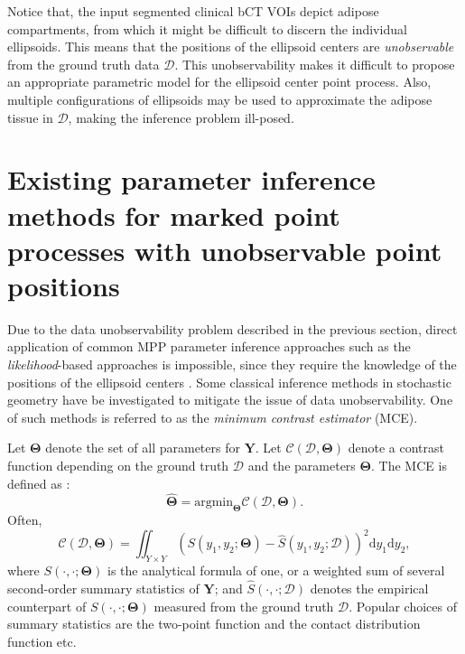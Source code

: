 \documentclass[journal]{IEEEtran}
\newcommand{\dd}[1]{\mathrm{d}#1}%
\begin{document}
Notice that, the input segmented clinical bCT VOIs depict adipose
compartments, from which it might be difficult to discern the
individual ellipsoids. This means that the positions of the ellipsoid
centers are \textit{unobservable} from the ground truth data
$\mathcal{D}$. This unobservability makes it difficult to propose an
appropriate parametric model for the ellipsoid center point
process. Also, multiple configurations of ellipsoids may be used to
approximate the adipose tissue in $\mathcal{D}$, making the inference
problem ill-posed.

\section{Existing parameter inference methods for marked point
  processes with unobservable point positions}
\label{sec:exist-param-infer}

Due to the data unobservability problem described in the previous
section, direct application of common MPP parameter inference
approaches such as the \textit{likelihood}-based approaches
\cite{moller2003statistical} is impossible, since they require the
knowledge of the positions of the ellipsoid centers
\cite{dereudre2014estimation}. Some classical inference methods in
stochastic geometry have be investigated to mitigate the issue of data
unobservability. One of such methods is referred to as the
\textit{minimum contrast estimator} (MCE).

Let $\mathbf{\Theta}$ denote the set of all parameters for
$\mathbf{Y}$. Let $\mathcal{C}(\mathcal{D}, \mathbf{\Theta})$ denote a
contrast function depending on the ground truth $\mathcal{D}$ and the
parameters $\mathbf{\Theta}$. The MCE is defined as
\cite{chiu2013stochastic}:
\begin{equation}
  \label{eq:min-const}
  \hat{\mathbf{\Theta}} =
  \text{argmin}_{\mathbf{\Theta}}
  \mathcal{C}(\mathcal{D}, \mathbf{\Theta}).
\end{equation}
Often,
\begin{equation}
  \label{eq:min-often}
  \mathcal{C}(\mathcal{D}, \mathbf{\Theta}) = \iint_{Y \times Y}
  \left( S(y_1, y_2; \mathbf{\Theta}) - \hat{S}(y_1, y_2;
    \mathcal{D}) \right)^2 \dd y_1 \dd y_2,
\end{equation}
where $S(\cdot, \cdot; \mathbf{\Theta})$ is the analytical formula of
one, or a weighted sum of several second-order summary statistics of
$\mathbf{Y}$; and $\hat{S}(\cdot, \cdot; \mathcal{D})$ denotes the
empirical counterpart of $S(\cdot, \cdot; \mathbf{\Theta})$ measured
from the ground truth $\mathcal{D}$. Popular choices of summary
statistics are the two-point function \cite{diggle1981binary} and the
contact distribution function \cite {heinrich1993asymptotic} etc.
\end{document}
